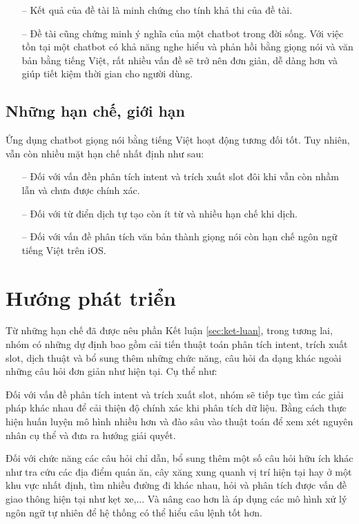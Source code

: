 \begin{itemize}
    \item[--] Kết quả của đề tài là minh chứng cho tính khả thi của đề tài.
    \item[--] Đề tài cũng chứng minh ý nghĩa của một chatbot trong đời sống. Với việc tồn tại một chatbot có khả năng nghe hiểu và phản hồi bằng giọng nói và văn bản bằng tiếng Việt, rất nhiều vấn đề sẽ trở nên đơn giản, dễ dàng hơn và giúp tiết kiệm thời gian cho người dùng.
\end{itemize}

\subsection{Những hạn chế, giới hạn}
Ứng dụng chatbot giọng nói bằng tiếng Việt hoạt động tương đối tốt. Tuy nhiên, vẫn còn nhiều mặt hạn chế nhất định như sau:
\begin{itemize}
    \item[--] Đối với vấn đền phân tích intent và trích xuất slot đôi khi vẫn còn nhầm lẫn và chưa được chính xác.
    \item[--] Đối với từ điển dịch tự tạo còn ít từ và nhiều hạn chế khi dịch.
    \item[--] Đối với vấn đề phân tích văn bản thành giọng nói còn hạn chế ngôn ngữ tiếng Việt trên iOS.
\end{itemize}

\section{Hướng phát triển}


Từ những hạn chế đã được nêu phần Kết luận \ref{sec:ket-luan}, trong tương lai, nhóm có những dự định bao gồm cải tiến thuật toán phân tích intent, trích xuất slot, dịch thuật và bổ sung thêm những chức năng, câu hỏi đa dạng khác ngoài những câu hỏi đơn giản như hiện tại. Cụ thể như:

Đối với vấn đề phân tích intent và trích xuất slot, nhóm sẽ tiếp tục tìm các giải pháp khác nhau để cải thiện độ chính xác khi phân tích dữ liệu. Bằng cách thực hiện huấn luyện mô hình nhiều hơn và đào sâu vào thuật toán để xem xét nguyên nhân cụ thể và đưa ra hướng giải quyết.

Đối với chức năng các câu hỏi chỉ dẫn, bổ sung thêm một số câu hỏi hữu ích khác như tra cứu các địa điểm quán ăn, cây xăng xung quanh vị trí hiện tại hay ở một khu vực nhất định, tìm nhiều đường đi khác nhau, hỏi và phân tích được vấn đề giao thông hiện tại như kẹt xe,... Và nâng cao hơn là áp dụng các mô hình xử lý ngôn ngữ tự nhiên để hệ thống có thể hiểu câu lệnh tốt hơn.